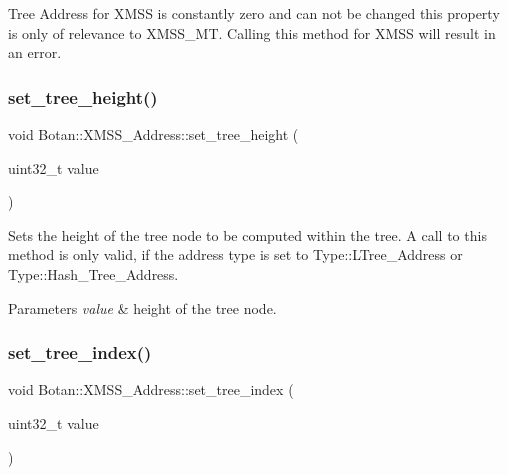 Tree Address for X\+M\+SS is constantly zero and can not be changed this property is only of relevance to X\+M\+S\+S\+\_\+\+MT. Calling this method for X\+M\+SS will result in an error. \mbox{\label{class_botan_1_1_x_m_s_s___address_a9bf7df26a0cfc5fee8bb44e22927f61c}} 
\subsubsection{\texorpdfstring{set\+\_\+tree\+\_\+height()}{set\_tree\_height()}}
{\footnotesize\ttfamily void Botan\+::\+X\+M\+S\+S\+\_\+\+Address\+::set\+\_\+tree\+\_\+height (\begin{DoxyParamCaption}\item[{uint32\+\_\+t}]{value }\end{DoxyParamCaption})\hspace{0.3cm}{\ttfamily [inline]}}

Sets the height of the tree node to be computed within the tree. A call to this method is only valid, if the address type is set to Type\+::\+L\+Tree\+\_\+\+Address or Type\+::\+Hash\+\_\+\+Tree\+\_\+\+Address.


\begin{DoxyParams}{Parameters}
{\em value} & height of the tree node. \\
\hline
\end{DoxyParams}
\mbox{\label{class_botan_1_1_x_m_s_s___address_a9e084bac434f5bca79368d145c4ac991}} 
\subsubsection{\texorpdfstring{set\+\_\+tree\+\_\+index()}{set\_tree\_index()}}
{\footnotesize\ttfamily void Botan\+::\+X\+M\+S\+S\+\_\+\+Address\+::set\+\_\+tree\+\_\+index (\begin{DoxyParamCaption}\item[{uint32\+\_\+t}]{value }\end{DoxyParamCaption})\hspace{0.3cm}{\ttfamily [inline]}}

